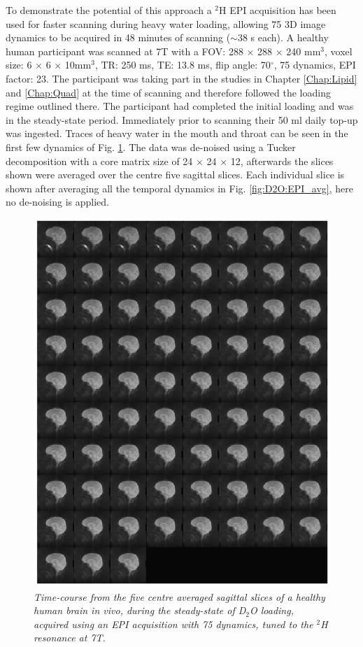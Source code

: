 To demonstrate the potential of this approach a $^2$H \ac{EPI} acquisition has been used for faster scanning during heavy water loading, allowing 75 3D image dynamics to be acquired in 48 minutes of scanning ($\sim$38 s each). A healthy human participant was scanned at 7T with a \ac{FOV}: 288 $\times$ 288 $\times$ 240 mm$^3$, voxel size: 6 $\times$ 6 $\times$ 10mm$^3$, \ac{TR}: 250 ms, TE: 13.8 ms, flip angle: 70$^\circ$, 75 dynamics, \ac{EPI} factor: 23. The participant was taking part in the studies in Chapter \ref{Chap:Lipid} and \ref{Chap:Quad} at the time of scanning and therefore followed the loading regime outlined there. The participant had completed the initial loading and was in the steady-state period. Immediately prior to scanning their 50 ml daily top-up was ingested. Traces of heavy water in the mouth and throat can be seen in the first few dynamics of Fig. \ref{fig:D2O:EPI}. The data was de-noised using a Tucker decomposition with a core matrix size of 24 $\times$ 24 $\times$ 12, afterwards the slices shown were averaged over the centre five sagittal slices. Each individual slice is shown after averaging all the temporal dynamics in Fig. \ref{fig:D2O:EPI_avg}, here no de-noising is applied.

\begin{figure}[H]
    \centering
    \includegraphics[width=1\textwidth]{Figures/D2O/EPI.png}
    \caption{\textit{Time-course from the five centre averaged sagittal slices of a healthy human brain in vivo, during the steady-state of D$_2$O loading, acquired using an \ac{EPI} acquisition with 75 dynamics, tuned to the $^2$H resonance at 7T.}}
    \label{fig:D2O:EPI}
\end{figure}

